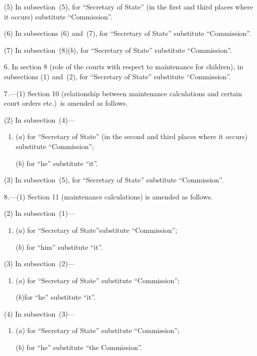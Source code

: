 \documentclass[12pt,a4paper]{article}
\begin{document}
(5) In subsection~(5), for “Secretary of State” (in the first and third places where it occurs) substitute “Commission”.

(6) In subsections (6) and~(7), for “Secretary of State” substitute “Commission”.

(7) In subsection~(8)($b$), for “Secretary of State” substitute “Commission”.

\medskip

6. In section 8 (role of the courts with respect to maintenance for children), in subsections (1) and~(2), for “Secretary of State” substitute “Commission”.

\medskip

7.---(1) Section 10 (relationship between maintenance calculations and certain court orders etc.)\ is amended as follows.

(2) In subsection~(4)—
\begin{enumerate}\item[]
($a$) for “Secretary of State” (in the second and third places where it occurs) substitute “Commission”;

($b$) for “he” substitute “it”.
\end{enumerate}

(3) In subsection~(5), for “Secretary of State” substitute “Commission”.

\medskip

8.---(1) Section 11 (maintenance calculations) is amended as follows.

(2) In subsection~(1)—
\begin{enumerate}\item[]
($a$) for “Secretary of State”substitute “Commission”;

($b$) for “him” substitute “it”.
\end{enumerate}

(3) In subsection~(2)—
\begin{enumerate}\item[]
($a$) for “Secretary of State” substitute “Commission”;

($b$)for “he” substitute “it”.
\end{enumerate}

(4) In subsection~(3)—
\begin{enumerate}\item[]
($a$) for “Secretary of State” substitute “Commission”;

($b$) for “he” substitute “the Commission”.
\end{enumerate}
\end{document}
